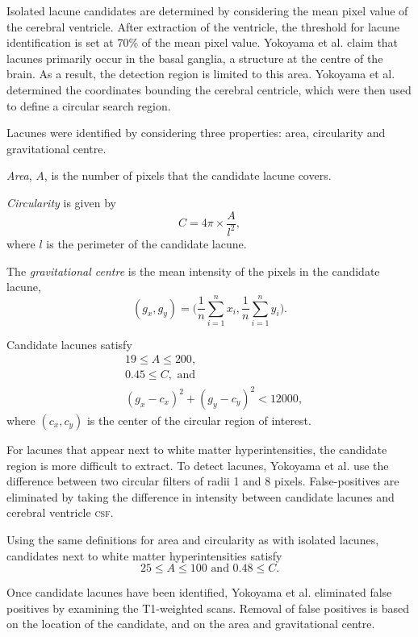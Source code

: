 Isolated lacune candidates are determined by considering the mean pixel value of the cerebral ventricle. After extraction of the ventricle, the threshold for lacune identification is set at 70\% of the mean pixel value. Yokoyama et al. claim that lacunes primarily occur in the basal ganglia, a structure at the centre of the brain. As a result, the detection region is limited to this area. Yokoyama et al. determined the coordinates bounding the cerebral centricle, which were then used to define a circular search region.

Lacunes were identified by considering three properties: area, circularity and gravitational centre.

\textit{Area}, $A$, is the number of pixels that the candidate lacune covers. 

\textit{Circularity} is given by
\[
	C = 4\pi \times \dfrac{A}{l^2},
\]
where $l$ is the perimeter of the candidate lacune.

The \textit{gravitational centre} is the mean intensity of the pixels in the candidate lacune,
\[
	(g_x, g_y) = \bigg(\dfrac{1}{n}\sum_{i=1}^nx_i, \dfrac{1}{n}\sum_{i=1}^ny_i\bigg).
\]


Candidate lacunes satisfy
\begin{align*}
	& 19 \le A \le 200, \\
	& 0.45 \le C,\text{ and } \\
	& (g_x - c_x)^2 + (g_y - c_y)^2 < 12000,
\end{align*}
where $(c_x, c_y)$ is the center of the circular region of interest.

For lacunes that appear next to white matter hyperintensities, the candidate region is more difficult to extract. To detect lacunes, Yokoyama et al. use the difference between two circular filters of radii 1 and 8 pixels. False-positives are eliminated by taking the difference in intensity between candidate lacunes and cerebral ventricle \textsc{csf}.

Using the same definitions for area and circularity as with isolated lacunes, candidates next to white matter hyperintensities satisfy
\[
	25 \le A \le 100\text{ and } 0.48 \le C.
\]

Once candidate lacunes have been identified, Yokoyama et al. eliminated false positives by examining the T1-weighted scans. Removal of false positives is based on the location of the candidate, and on the area and gravitational centre.

